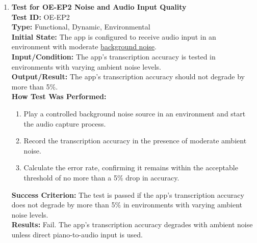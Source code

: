 \documentclass[12pt, titlepage]{article}
\begin{document}
\begin{enumerate}
    \item \textbf{Test for OE-EP2 Noise and Audio Input Quality} \\
      \newline
      \textbf{Test ID:} OE-EP2 \\
      \textbf{Type:} Functional, Dynamic, Environmental \\
      \textbf{Initial State:} The app is configured to receive audio input in an environment with moderate 
      \href{https://github.com/emilyperica/ScoreGen/tree/main/test/TestingDatasets/noise-samples}{background noise}\citep*{noise}. \\
      \textbf{Input/Condition:} The app’s transcription accuracy is tested in environments with varying ambient noise levels. \\
      \textbf{Output/Result:} The app’s transcription accuracy should not degrade by more than 5\%. \\
      \textbf{How Test Was Performed:}
      \begin{enumerate}
          \item Play a controlled background noise source in an environment and start the audio capture process.
          \item Record the transcription accuracy in the presence of moderate ambient noise.
          \item Calculate the error rate, confirming it remains within the acceptable threshold of no more than a 5\% drop in accuracy.
      \end{enumerate}
      \textbf{Success Criterion:} The test is passed if the app’s transcription accuracy does not degrade by more than 5\% in environments with varying ambient noise levels.\\
      \textbf{Results:} Fail. The app's transcription accuracy degrades with ambient noise unless direct piano-to-audio input is used.\\


\end{enumerate}
\end{document}
